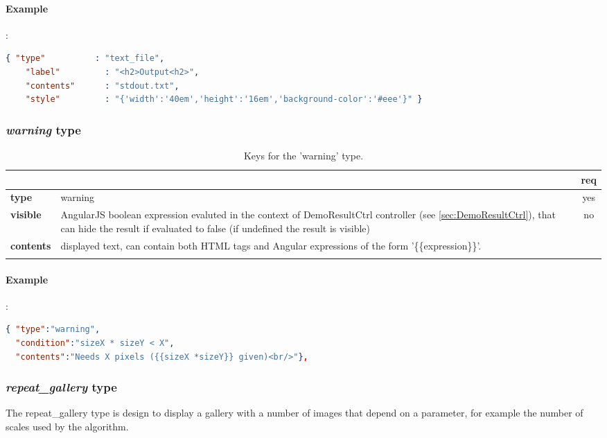 \paragraph{Example}:\\
\begin{lstlisting}[language=json,firstnumber=1]
  { "type"          : "text_file", 
    "label"         : "<h2>Output<h2>",
    "contents"      : "stdout.txt",
    "style"         : "{'width':'40em','height':'16em','background-color':'#eee'}" }
\end{lstlisting}

\subsubsection{ \emph{warning} type}

\begin{longtable}{|>{\bf}L{\linewidth}|L{\linewidth}|c|}
\hline
      &  & {\bf req} 
\tabularnewline \hline \hline
 type      & warning  & yes \\ \hline
 visible   & AngularJS boolean expression evaluted in the context of DemoResultCtrl
             controller (see \ref{sec:DemoResultCtrl}), that can hide the result if
             evaluated to false (if undefined the result is visible)& no \\ \hline
 contents  & displayed text, can contain both HTML tags and Angular
expressions of the form '\{\{expression\}\}'. & \\ \hline
\caption{Keys for the 'warning' type.}
\end{longtable}
\paragraph{Example}:\\
\begin{lstlisting}[language=json,firstnumber=1]
{ "type":"warning", 
  "condition":"sizeX * sizeY < X",
  "contents":"Needs X pixels ({{sizeX *sizeY}} given)<br/>"},
\end{lstlisting}


\subsubsection{ \emph{repeat\_gallery} type}
The repeat\_gallery type is design to display a gallery with a number of images 
that depend on a parameter, for example the number of scales used by the 
algorithm.


